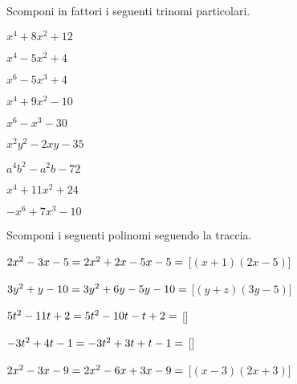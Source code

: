 \begin{esercizio}
 \label{ese:17.5}
 Scomponi in fattori i seguenti trinomi particolari.
 \begin{multicols}{3}
 \begin{enumeratea}
 \item $x^{4}+8x^{2}+12$
 \item $x^{4}-5x^{2}+4$
 \item $x^{6}-5x^{3}+4$
 \item $x^{4}+9x^{2}-10$
 \item $x^{6}-x^{3}-30$
 \item $x^{2}y^{2}-2xy-35$
 \item $a^{4}b^{2}-a^{2}b-72$
 \item $x^{4}+11x^{2}+24$
 \item $-x^{6}+7x^{3}-10$
 \end{enumeratea}
\end{multicols}
\end{esercizio}

\begin{esercizio}[\Ast]
 \label{ese:17.9}
 Scomponi i seguenti polinomi seguendo la traccia.
 \begin{enumeratea}
 \item $2x^{{2}}-3x-5=2x^{2}+2x-5x-5=\dotfill$ \hfill [$(x+1)(2x-5)$]
 \item $3y^{{2}}+y-10 = 3y^{2}+6y-5y-10 =\dotfill$ \hfill [$(y+z)(3y-5)$]
 \item $5t^{{2}}-11t+2 = 5t^{2}-10t-t+2 =\dotfill$ \hfill []
 \item $-3t^{{2}}+4t-1= -3t^{2}+3t+t-1 = \dotfill$ \hfill []
 \item $2x^{2}-3x-9= 2x^{2}-6x+3x-9 = \dotfill$ \hfill [$(x-3)\left(2x+3\right)$]
 \end{enumeratea}
\end{esercizio}


